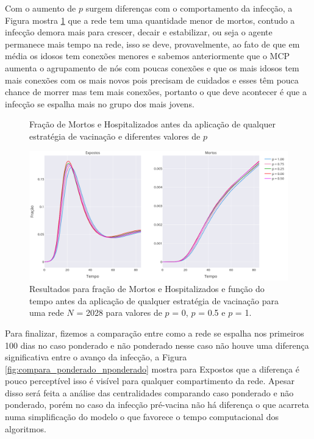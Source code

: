 Com o aumento de $p$ surgem diferenças com o comportamento da infecção, a Figura mostra \ref{fig:pre_vacina_mortos_p} que a rede tem uma quantidade menor de mortos, contudo a infecção demora mais para crescer, decair e estabilizar, ou seja o agente permanece mais tempo na rede, isso se deve, provavelmente, ao fato de que em média os idosos tem conexões menores e sabemos anteriormente que o MCP aumenta o agrupamento de nós com poucas conexões e que os mais idosos tem mais conexões com os mais novos pois precisam de cuidados e esses têm pouca chance de morrer mas tem mais conexões, portanto o que deve acontecer é que a infecção se espalha mais no grupo dos mais jovens.

\begin{figure}[H]
    \centering
    \captionsetup{font=normalsize,skip=0.8pt,singlelinecheck=on,labelsep=endash}
    \caption{Fração de Mortos e Hospitalizados antes da aplicação de qualquer estratégia de vacinação e diferentes valores de $p$}
    \vspace{5pt}
    \includegraphics[width=\textwidth]{figuras/pre_vacina_mortos_p_nponderado.png}
    \captionsetup{font=small,justification=justified}
    \caption*{Resultados para fração de Mortos e Hospitalizados e função do tempo antes da aplicação de qualquer estratégia de vacinação para uma rede $N$ = 2028 para valores de $p$ = 0, $p$ = 0.5 e $p$ = 1.}
    \label{fig:pre_vacina_mortos_p}
\end{figure}

Para finalizar, fizemos a comparação entre como a rede se espalha nos primeiros 100 dias no caso ponderado e não ponderado nesse caso  não houve uma diferença significativa entre o avanço da infecção, a Figura \ref{fig:compara_ponderado_nponderado} mostra para Expostos que a diferença é pouco perceptível isso é visível para qualquer compartimento da rede. Apesar disso será feita a análise das centralidades comparando caso ponderado e não ponderado, porém no caso da infecção pré-vacina não há diferença o que acarreta numa simplificação do modelo o que favorece o tempo computacional dos algoritmos.

